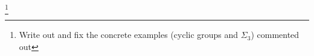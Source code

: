 \footnote{Write out and fix the concrete examples (cyclic groups and $\Sigma_3$) commented out}








